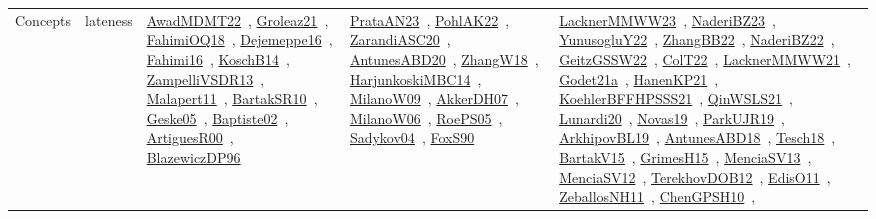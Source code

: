 {\begin{longtable}{lp{3cm}>{\raggedright\arraybackslash}p{6cm}>{\raggedright\arraybackslash}p{6cm}>{\raggedright\arraybackslash}p{8cm}}
Concepts & lateness & \href{../works/AwadMDMT22.pdf}{AwadMDMT22}~\cite{AwadMDMT22}, \href{../works/Groleaz21.pdf}{Groleaz21}~\cite{Groleaz21}, \href{../works/FahimiOQ18.pdf}{FahimiOQ18}~\cite{FahimiOQ18}, \href{../works/Dejemeppe16.pdf}{Dejemeppe16}~\cite{Dejemeppe16}, \href{../works/Fahimi16.pdf}{Fahimi16}~\cite{Fahimi16}, \href{../works/KoschB14.pdf}{KoschB14}~\cite{KoschB14}, \href{../works/ZampelliVSDR13.pdf}{ZampelliVSDR13}~\cite{ZampelliVSDR13}, \href{../works/Malapert11.pdf}{Malapert11}~\cite{Malapert11}, \href{../works/BartakSR10.pdf}{BartakSR10}~\cite{BartakSR10}, \href{../works/Geske05.pdf}{Geske05}~\cite{Geske05}, \href{../works/Baptiste02.pdf}{Baptiste02}~\cite{Baptiste02}, \href{../works/ArtiguesR00.pdf}{ArtiguesR00}~\cite{ArtiguesR00}, \href{../works/BlazewiczDP96.pdf}{BlazewiczDP96}~\cite{BlazewiczDP96} & \href{../works/PrataAN23.pdf}{PrataAN23}~\cite{PrataAN23}, \href{../works/PohlAK22.pdf}{PohlAK22}~\cite{PohlAK22}, \href{../works/ZarandiASC20.pdf}{ZarandiASC20}~\cite{ZarandiASC20}, \href{../works/AntunesABD20.pdf}{AntunesABD20}~\cite{AntunesABD20}, \href{../works/ZhangW18.pdf}{ZhangW18}~\cite{ZhangW18}, \href{../works/HarjunkoskiMBC14.pdf}{HarjunkoskiMBC14}~\cite{HarjunkoskiMBC14}, \href{../works/MilanoW09.pdf}{MilanoW09}~\cite{MilanoW09}, \href{../works/AkkerDH07.pdf}{AkkerDH07}~\cite{AkkerDH07}, \href{../works/MilanoW06.pdf}{MilanoW06}~\cite{MilanoW06}, \href{../works/RoePS05.pdf}{RoePS05}~\cite{RoePS05}, \href{../works/Sadykov04.pdf}{Sadykov04}~\cite{Sadykov04}, \href{../works/FoxS90.pdf}{FoxS90}~\cite{FoxS90} & \href{../works/LacknerMMWW23.pdf}{LacknerMMWW23}~\cite{LacknerMMWW23}, \href{../works/NaderiBZ23.pdf}{NaderiBZ23}~\cite{NaderiBZ23}, \href{../works/YunusogluY22.pdf}{YunusogluY22}~\cite{YunusogluY22}, \href{../works/ZhangBB22.pdf}{ZhangBB22}~\cite{ZhangBB22}, \href{../works/NaderiBZ22.pdf}{NaderiBZ22}~\cite{NaderiBZ22}, \href{../works/GeitzGSSW22.pdf}{GeitzGSSW22}~\cite{GeitzGSSW22}, \href{../works/ColT22.pdf}{ColT22}~\cite{ColT22}, \href{../works/LacknerMMWW21.pdf}{LacknerMMWW21}~\cite{LacknerMMWW21}, \href{../works/Godet21a.pdf}{Godet21a}~\cite{Godet21a}, \href{../works/HanenKP21.pdf}{HanenKP21}~\cite{HanenKP21}, \href{../works/KoehlerBFFHPSSS21.pdf}{KoehlerBFFHPSSS21}~\cite{KoehlerBFFHPSSS21}, \href{../works/QinWSLS21.pdf}{QinWSLS21}~\cite{QinWSLS21}, \href{../works/Lunardi20.pdf}{Lunardi20}~\cite{Lunardi20}, \href{../works/Novas19.pdf}{Novas19}~\cite{Novas19}, \href{../works/ParkUJR19.pdf}{ParkUJR19}~\cite{ParkUJR19}, \href{../works/ArkhipovBL19.pdf}{ArkhipovBL19}~\cite{ArkhipovBL19}, \href{../works/AntunesABD18.pdf}{AntunesABD18}~\cite{AntunesABD18}, \href{../works/Tesch18.pdf}{Tesch18}~\cite{Tesch18}, \href{../works/BartakV15.pdf}{BartakV15}~\cite{BartakV15}, \href{../works/GrimesH15.pdf}{GrimesH15}~\cite{GrimesH15}, \href{../works/MenciaSV13.pdf}{MenciaSV13}~\cite{MenciaSV13}, \href{../works/MenciaSV12.pdf}{MenciaSV12}~\cite{MenciaSV12}, \href{../works/TerekhovDOB12.pdf}{TerekhovDOB12}~\cite{TerekhovDOB12}, \href{../works/EdisO11.pdf}{EdisO11}~\cite{EdisO11}, \href{../works/ZeballosNH11.pdf}{ZeballosNH11}~\cite{ZeballosNH11}, \href{../works/ChenGPSH10.pdf}{ChenGPSH10}~\cite{ChenGPSH10}, 
\end{longtable}}
